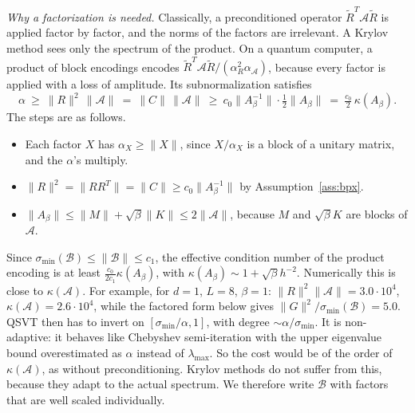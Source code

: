 \documentclass[11pt,a4paper]{article}
\newcommand{\A}{\mathcal{A}}
\newcommand{\B}{\mathcal{B}}
\newcommand{\Rt}{\widetilde R}
\theoremstyle{remark}
\begin{document}
\emph{Why a factorization is needed.} Classically, a preconditioned operator
$\Rt^T\A\Rt$ is applied factor by factor, and the norms of the factors are
irrelevant. A Krylov method sees only the spectrum of the product. On a
quantum computer, a product of block encodings encodes
$\Rt^T\A\Rt/(\alpha_R^2\alpha_\A)$, because every factor is applied with a loss of
amplitude. Its subnormalization satisfies
\begin{equation}\label{eq:naivealpha}
\alpha\ \ge\ \|R\|^2\,\|\A\|\ =\ \|C\|\,\|\A\|\ \ge\ c_0\|A_\beta^{-1}\|\cdot\tfrac12\|A_\beta\|\ =\ \tfrac{c_0}{2}\,\kappa(A_\beta).
\end{equation}
The steps are as follows.
\begin{itemize}
\item Each factor $X$ has $\alpha_X\ge\|X\|$, since $X/\alpha_X$ is a block of a
  unitary matrix, and the $\alpha$'s multiply.
\item $\|R\|^2=\|RR^T\|=\|C\|\ge c_0\|A_\beta^{-1}\|$ by Assumption~\ref{ass:bpx}.
\item $\|A_\beta\|\le\|M\|+\sqrt\beta\|K\|\le2\|\A\|$, because $M$ and $\sqrt\beta K$ are
  blocks of $\A$.
\end{itemize}
Since $\sigma_{\min}(\B)\le\|\B\|\le c_1$, the effective condition number of the
product encoding is at least $\frac{c_0}{2c_1}\kappa(A_\beta)$, with
$\kappa(A_\beta)\sim1+\sqrt\beta h^{-2}$. Numerically this is close to $\kappa(\A)$. For
example, for $d=1$, $L=8$, $\beta=1$: $\|R\|^2\|\A\|=3.0\cdot10^4$, $\kappa(\A)=2.6\cdot10^4$, while
the factored form below gives $\|G\|^2/\sigma_{\min}(\B)=5.0$. QSVT then has to
invert on $[\sigma_{\min}/\alpha,1]$, with degree $\sim\alpha/\sigma_{\min}$. It is non-adaptive:
it behaves like Chebyshev semi-iteration with the upper eigenvalue bound
overestimated as $\alpha$ instead of $\lambda_{\max}$. So the cost would be of the
order of $\kappa(\A)$, as without preconditioning. Krylov methods do not
suffer from this, because they adapt to the actual spectrum. We therefore
write $\B$ with factors that are well scaled individually.
\end{document}
